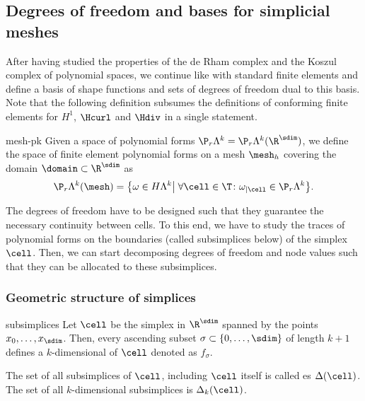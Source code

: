 \subsection{Degrees of freedom and bases for simplicial meshes}

\begin{intro}
  After having studied the properties of the de Rham complex and the
  Koszul complex of polynomial spaces, we continue like with standard
  finite elements and define a basis of shape functions and sets of
  degrees of freedom dual to this basis. Note that the following
  definition subsumes the definitions of conforming finite elements
  for $H^1$, $\Hcurl$ and $\Hdiv$ in a single statement.
\end{intro}

\begin{Definition}{mesh-pk}
  Given a space of polynomial forms
  $\P_r\Lambda^k=\P_r\Lambda^k(\R^\sdim)$, we define the space of finite
  element polynomial forms on a mesh $\mesh_h$ covering the domain
  $\domain\subset\R^\sdim$ as
  \begin{gather}
    \P_r\Lambda^k(\mesh) = \bigl\{
    \omega \in H\Lambda^k \big|
    \;\forall \cell\in\T\colon \omega_{|\cell} \in \P_r\Lambda^k
    \bigr\}.
  \end{gather}
\end{Definition}

\begin{intro}
  The degrees of freedom have to be designed such that they guarantee
  the necessary continuity between cells. To this end, we have to
  study the traces of polynomial forms on the boundaries (called
  subsimplices below) of the simplex $\cell$. Then, we can start
  decomposing degrees of freedom and node values such that they can be
  allocated to these subsimplices.
\end{intro}

\subsubsection{Geometric structure of simplices}

\begin{Definition}{subsimplices}
  Let $\cell$ be the simplex in $\R^\sdim$ spanned by the points
  $x_0,\dots,x_\sdim$. Then, every ascending subset
  $\sigma \subset \{0,\dots,\sdim\}$ of length $k+1$ defines a
  $k$-dimensional  of $\cell$ denoted as $f_\sigma$.

  The set of all subsimplices of $\cell$, including $\cell$ itself is
  called es
   $\Delta(\cell)$. The set of all $k$-dimensional subsimplices
  is  $\Delta_k(\cell)$.
\end{Definition}

